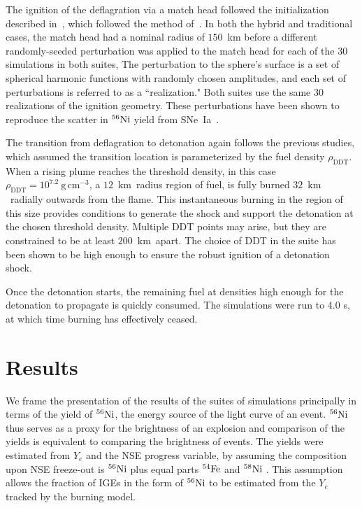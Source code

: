 \documentclass[iop,apj]{emulateapj}
\newcommand{\SNeIa}{SNe~Ia}
\newcommand{\Ni}[1]{\ensuremath{{}^{#1}{\rm Ni}}}
\newcommand{\Fe}[1]{\ensuremath{{}^{#1}{\rm Fe}}}
\newcommand{\unitspace}{\ensuremath{\,}}
\newcommand{\usp}{\unitspace}
\newcommand{\unitstyle}[1]{\ensuremath{\mathrm{#1}}}
\newcommand{\power}[2]{\ensuremath{{#1}^{#2}}}
\newcommand{\centi}{\unitstyle{c}}
\newcommand{\kilo}{\unitstyle{k}}
\newcommand{\meter}{\unitstyle{m}}
\newcommand{\cm}{\centi\meter}
\newcommand{\gram}{\unitstyle{g}}
\newcommand{\grampercc}{\gram\usp\power{\cm}{-3}} %
\newcommand{\km}{\kilo\meter}   %
\begin{document}
The ignition of the deflagration via a match head followed the
initialization described in~\citet{Kruegeretal2012}, which
followed the method of~\citet{townetal2009}.
In both the hybrid and traditional cases, the match head had a
nominal radius of $150$~km before
a different randomly-seeded perturbation was applied to the
match head for each of the 30 simulations in both suites,
The perturbation to the sphere's surface is a set of
spherical harmonic functions with randomly chosen amplitudes, and
each set of perturbations is referred to as a ``realization."
Both suites use the same 30 realizations of the ignition geometry.
These perturbations have been shown to reproduce
the scatter in \Ni{56}
yield from \SNeIa\ \citet{townetal2009}.


The transition from deflagration to detonation again follows
the previous studies, which assumed the transition location
is parameterized by the fuel density $\rho_{\mathrm{DDT}}$.
When a rising plume reaches the threshold density, in this case $\rho_{\mathrm{DDT}} = 10^{7.2}~\grampercc$, a $12$~\km\ radius region of fuel, is fully burned $32$~\km\ radially outwards from the flame.
This
instantaneous burning in the region of this size provides conditions
to generate the shock and support the detonation at the chosen
threshold density.  Multiple DDT points may arise, but they are
constrained to be at least $200$~\km\ apart. The choice of DDT
in the suite has been shown to be high enough to ensure
the robust ignition of a detonation shock.

Once the detonation starts, the remaining fuel at densities
high enough for the detonation to propagate is quickly consumed.
The simulations were run to 4.0 s, at which time burning
has effectively ceased.


\section{Results}

We frame the presentation of the results of the suites of simulations
principally in terms of the yield of \Ni{56}, the energy source of
the light curve of an event. \Ni{56} thus serves as a proxy
for the brightness of an explosion and comparison of the yields
is equivalent to comparing the brightness of events. The
yields were estimated from $Y_e$ and the NSE progress
variable, by assuming the composition upon NSE freeze-out is \Ni{56} plus equal
parts \Fe{54} and \Ni{58} \citep{townetal2009,Meaketal09}.
This assumption allows the fraction of IGEs in the form of \Ni{56} to be estimated from the $Y_e$ tracked by the burning model.
\end{document}
